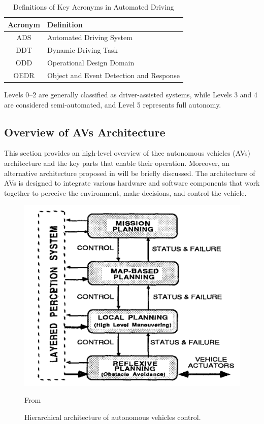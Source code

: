 \begin{table}[ht]
    \centering
    \begin{tabular}{|c|l|}
        \hline
        \textbf{Acronym} & \textbf{Definition} \\ \hline
        ADS & Automated Driving System \\ \hline
        DDT & Dynamic Driving Task \\ \hline
        ODD & Operational Design Domain \\ \hline
        OEDR & Object and Event Detection and Response \\ \hline
    \end{tabular}
    \caption{Definitions of Key Acronyms in Automated Driving}
    \label{tab:acronyms}
\end{table}

Levels 0–2 are generally classified as driver-assisted systems, while Levels 3 and 4 are considered semi-automated, and Level 5 represents full autonomy.

\subsection{Overview of AVs Architecture}\label{subsec:overview-on-avs-architecture}

This section provides an high-level overview of thee autonomous vehicles (AVs) architecture and the key parts that enable their operation.
Moreover, an alternative architecture proposed in \cite{2023survey} will be briefly discussed.
The architecture of AVs is designed to integrate various hardware and software components that work together to perceive the environment, make decisions, and control the vehicle.

\cite{architecture}

\begin{figure}[!htb]
    \centering
    \includegraphics[width=0.7\linewidth]{figures/state-architecture}
    \caption{Hierarchical architecture of autonomous vehicles control.}
    \footnotesize{From \cite{architecture} }
    \label{fig:architecture}
\end{figure}

